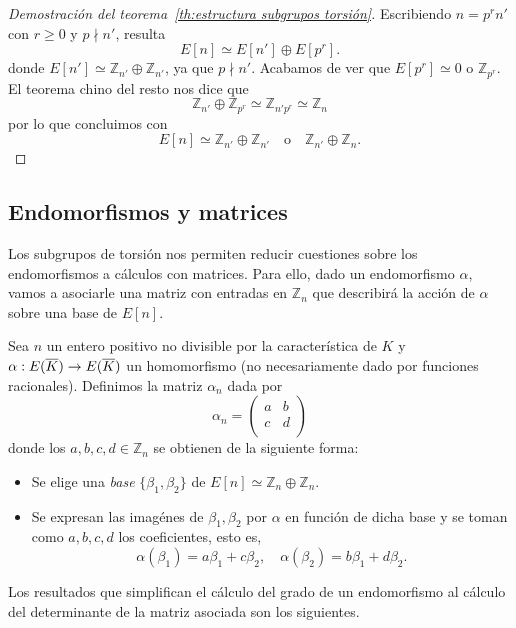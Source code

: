 \begin{proof}[Demostración del teorema~\ref{th:estructura subgrupos torsión}]
Escribiendo $n = p^r n'$ con $r \geq 0$ y $p \nmid n'$, resulta
$$
	E[n] \simeq E[n'] \oplus E[p^r].
$$
donde $E[n'] \simeq \mathbb{Z}_{n'} \oplus \mathbb{Z}_{n'}$, ya que $p \nmid n'$. Acabamos de ver que $E[p^r] \simeq 0$ o $\mathbb{Z}_{p^r}$. El teorema chino del resto nos dice que
$$
	\mathbb{Z}_{n'} \oplus \mathbb{Z}_{p^r} \simeq \mathbb{Z}_{n' p^r} \simeq \mathbb{Z}_{n}
$$
por lo que concluimos con
$$
	E[n] \simeq \mathbb{Z}_{n'} \oplus \mathbb{Z}_{n'} \quad \textrm{o} \quad  \mathbb{Z}_{n'} \oplus \mathbb{Z}_{n}.
$$
\end{proof}


\subsection{Endomorfismos y matrices}
\label{subs:Endomorfismos y matrices}

Los subgrupos de torsión nos permiten reducir cuestiones sobre los endomorfismos a cálculos con matrices. Para ello, dado un endomorfismo $\alpha$, vamos a asociarle una matriz con entradas en $\mathbb{Z}_{n}$ que describirá la acción de $\alpha$ sobre una base de $E[n]$.

\begin{definicion}\label{def: matriz endomorfismo}
	Sea $n$ un entero positivo no divisible por la característica de $K$ y $\alpha: E(\overline{K}) \to E(\overline{K})$ un homomorfismo (no necesariamente dado por funciones racionales). Definimos la matriz $\alpha_n$ dada por
	$$
	\alpha_n =
	\begin{pmatrix}
		a & b \\
		c & d \\
	\end{pmatrix}
	$$
	donde los $a, b, c, d \in \mathbb{Z}_{n}$ se obtienen de la siguiente forma:
	\begin{itemize}
		\item Se elige una \emph{base} $\{ \beta_1, \beta_2 \}$ de $E[n] \simeq  \mathbb{Z}_{n} \oplus  \mathbb{Z}_{n}$.
		\item Se expresan las imagénes de $\beta_1, \beta_2$ por $\alpha$ en función de dicha base y se toman como $a, b, c, d$ los coeficientes, esto es,
		$$
			\alpha(\beta_1) = a \beta_1 + c \beta_2, \quad
			\alpha(\beta_2) = b \beta_1 + d \beta_2.
		$$
	\end{itemize}
\end{definicion}

Los resultados que simplifican el cálculo del grado de un endomorfismo al cálculo del determinante de la matriz asociada son los siguientes.

